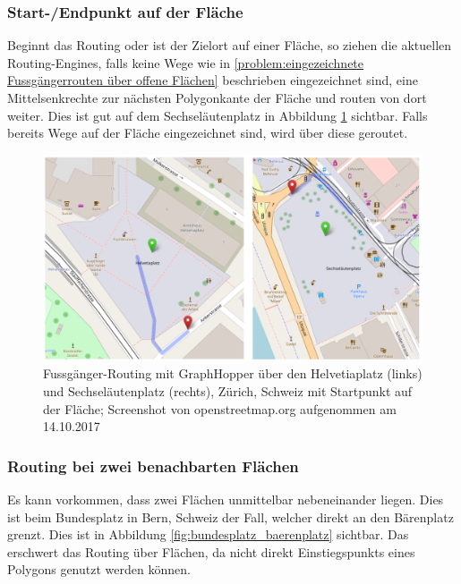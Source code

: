 \subsubsection{Start-/Endpunkt auf der Fläche}
\label{problem:Start-/Endpunkt auf der Fläche}
Beginnt das Routing oder ist der Zielort auf einer Fläche, so ziehen die aktuellen Routing-Engines, falls keine Wege wie in \ref{problem:eingezeichnete Fussgängerrouten über offene Flächen} beschrieben eingezeichnet sind, eine Mittelsenkrechte zur nächsten Polygonkante der Fläche und routen von dort weiter. Dies ist gut auf dem Sechseläutenplatz in Abbildung \ref{fig:start_endpoint_on_area} sichtbar. Falls bereits Wege auf der Fläche eingezeichnet sind, wird über diese geroutet.

\begin{figure}[ht]
    \centering
    \includegraphics[width=1\linewidth]{technicalreport/img/start_endpoint_on_area}
    \caption[Fussgänger-Routing mit Startpunkt auf der Fläche]{Fussgänger-Routing mit GraphHopper über den Helvetiaplatz (links) und Sechseläutenplatz (rechts), Zürich, Schweiz mit Startpunkt auf der Fläche; Screenshot von openstreetmap.org aufgenommen am 14.10.2017}
    \label{fig:start_endpoint_on_area}
\end{figure}

\subsubsection{Routing bei zwei benachbarten Flächen}
\label{problem:Routing bei zwei benachbarten Flächen}
Es kann vorkommen, dass zwei Flächen unmittelbar nebeneinander liegen. Dies ist beim Bundesplatz in Bern, Schweiz der Fall, welcher direkt an den Bärenplatz grenzt. Dies ist in Abbildung \ref{fig:bundesplatz_baerenplatz} sichtbar. Das erschwert das Routing über Flächen, da nicht direkt \glspl{Einstiegspunkt} eines Polygons genutzt werden können.

